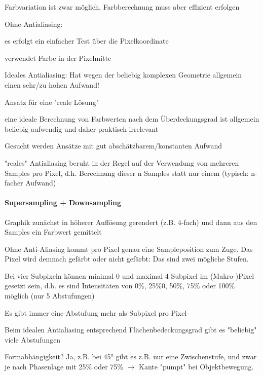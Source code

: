\documentclass[landscape]{article}
\begin{document}
\begin{multicols}{3}
\begin{itemize*}
\begin{itemize*}
            \item Farbvariation ist zwar möglich, Farbberechnung muss aber effizient erfolgen
          \end{itemize*}
    \item Ohne Antialiasing:
          \begin{itemize*}
            \item es erfolgt ein einfacher Test über die Pixelkoordinate
            \item verwendet Farbe in der Pixelmitte
          \end{itemize*}
    \item Ideales Antialiasing: Hat wegen der beliebig komplexen Geometrie allgemein einen sehr/zu hohen Aufwand!
    \item Ansatz für eine "reale Lösung"
          \begin{itemize*}
            \item eine ideale Berechnung von Farbwerten nach dem Überdeckungsgrad ist allgemein beliebig aufwendig und daher praktisch irrelevant
            \item Gesucht werden Ansätze mit gut abschätzbarem/konstanten Aufwand
            \item "reales" Antialiasing beruht in der Regel auf der Verwendung von mehreren Samples pro Pixel, d.h. Berechnung dieser n Samples statt nur einem (typisch: n-facher Aufwand)
          \end{itemize*}
  \end{itemize*}
  
  \paragraph{Supersampling + Downsampling}
  \begin{itemize*}
    \item Graphik zunächst in höherer Auflösung gerendert (z.B. 4-fach) und dann aus den Samples ein Farbwert gemittelt
    \item Ohne Anti-Aliasing kommt pro Pixel genau eine Sampleposition zum Zuge. Das Pixel wird demnach gefärbt oder nicht gefärbt: Das sind zwei mögliche Stufen.
    \item Bei vier Subpixeln können minimal 0 und maximal 4 Subpixel im (Makro-)Pixel gesetzt sein, d.h. es sind Intensitäten von 0\%, 25\%0, 50\%, 75\% oder 100\% möglich (nur 5 Abstufungen)
    \item Es gibt immer eine Abstufung mehr als Subpixel pro Pixel
    \item Beim idealen Antialiasing entsprechend Flächenbedeckungsgrad gibt es "beliebig" viele Abstufungen
    \item Formabhängigkeit? Ja, z.B. bei 45° gibt es z.B. nur eine Zwischenstufe, und zwar je nach Phasenlage mit 25\% oder 75\% $\rightarrow$ Kante "pumpt" bei Objektbewegung.
  \end{itemize*}

\end{multicols}
\end{document}
